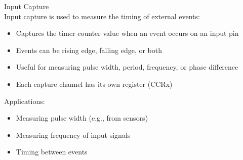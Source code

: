 \begin{concept}{Input Capture}\\
Input capture is used to measure the timing of external events:
\begin{itemize}
    \item Captures the timer counter value when an event occurs on an input pin
    \item Events can be rising edge, falling edge, or both
    \item Useful for measuring pulse width, period, frequency, or phase difference
    \item Each capture channel has its own register (CCRx)
\end{itemize}
Applications:
\begin{itemize}
    \item Measuring pulse width (e.g., from sensors)
    \item Measuring frequency of input signals
    \item Timing between events
\end{itemize}
\end{concept}

